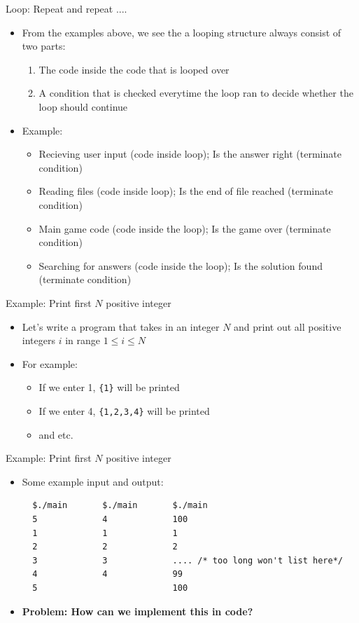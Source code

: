 \documentclass[10pt,xcolor={table,dvipsnames},t]{beamer}
\begin{document}
\begin{frame}{Loop: Repeat and repeat ....}
  \begin{itemize}
    \item From the examples above, we see the a looping structure always consist of two parts:
    \begin{enumerate}
      \item The code inside the code that is looped over 
      \item A condition that is checked everytime the loop ran to decide whether the loop should continue
    \end{enumerate}
    \item  Example: 
    \begin{itemize}
      \item Recieving user input (code inside loop); Is the answer right (terminate condition)
      \item Reading files (code inside loop); Is the end of file reached (terminate condition)
      \item Main game code (code inside the loop); Is the game over (terminate condition)
      \item Searching for answers (code inside the loop); Is the solution found (terminate condition)
    \end{itemize}
  \end{itemize}
\end{frame}

\begin{frame}{Example: Print first $N$ positive integer}
\begin{itemize}
  \item Let's write a program that takes in an integer $N$ and print out all positive integers $i$ in range $1\leq i \leq N$
  \item For example:
  \begin{itemize}
    \item If we enter 1, \texttt{\{1\}} will be printed
    \item If we enter 4, \texttt{\{1,2,3,4\}} will be printed 
    \item and etc.
  \end{itemize}
\end{itemize}
\end{frame}

\begin{frame}[fragile]{Example: Print first $N$ positive integer}
  \begin{itemize}
    \item Some example input and output:
\begin{lstlisting}
  $./main       $./main       $./main 
  5             4             100
  1             1             1
  2             2             2
  3             3             .... /* too long won't list here*/
  4             4             99
  5                           100
\end{lstlisting}
  
  \item \textbf{Problem: How can we implement this in code?}
  \end{itemize}
\end{frame}
\end{document}
